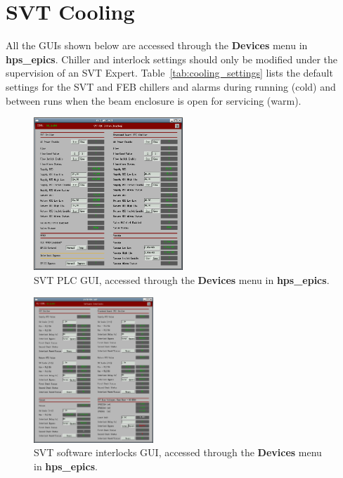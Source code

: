 \section{SVT Cooling}

All the GUIs shown below are accessed through the \textbf{Devices} menu in \textbf{hps\_epics}. Chiller and interlock settings should only be modified under the supervision of an SVT Expert. Table~\ref{tab:cooling_settings} lists the default settings for the SVT and FEB chillers and alarms during running (cold) and between runs when the beam enclosure is open for servicing (warm).

\begin{figure}[!ht]
    \begin{center}
        \includegraphics[width=0.5\textwidth]{svt_plc.png}
        \caption{SVT PLC GUI, accessed through the \textbf{Devices} menu in \textbf{hps\_epics}.}
        \label{fig:ctrl_cooling_plc}
    \end{center}
\end{figure}

\begin{figure}[!ht]
    \begin{center}
        \includegraphics[width=0.4\textwidth]{svt_softinterlocks.png}
        \caption{SVT software interlocks GUI, accessed through the \textbf{Devices} menu in \textbf{hps\_epics}.}
        \label{fig:ctrl_cooling_softinterlocks}
    \end{center}
\end{figure}

